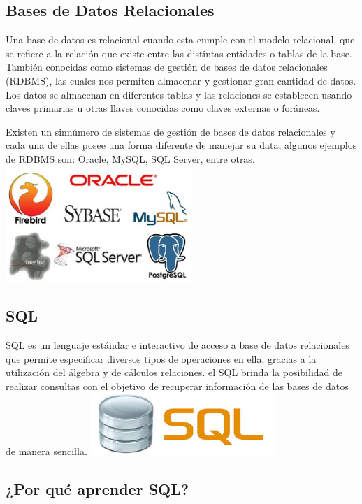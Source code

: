 \documentclass[twoside,twocolumn]{article}
\begin{document}
\subsection{Bases de Datos Relacionales}

Una base de datos es relacional cuando esta cumple con el modelo relacional, que se refiere a la relación que existe entre las distintas entidades o tablas de la base. También conocidas como sistemas de gestión de bases de datos relacionales (RDBMS), las cuales nos permiten almacenar y gestionar gran cantidad de datos. Los datos se almacenan en diferentes tablas y las relaciones se establecen usando claves primarias u otras llaves conocidas como claves externas o foráneas.

Existen un sinnúmero de sistemas de gestión de bases de datos relacionales y cada una de ellas posee una forma diferente de manejar su data, algunos ejemplos de RDBMS son: Oracle, MySQL, SQL Server, entre otras.
\includegraphics[width=7cm]{./Imagenes/sistemasgestionbd} 
\subsection{SQL}

SQL es un lenguaje estándar e interactivo de acceso a base de datos relacionales que permite especificar diversos tipos de operaciones en ella, gracias a la utilización del álgebra y de cálculos relaciones. el SQL brinda la posibilidad de realizar consultas con el objetivo de recuperar información de las bases de datos de manera sencilla.
\includegraphics[width=7cm]{./Imagenes/sql}  

\subsection{¿Por qué aprender SQL?}
\end{document}
